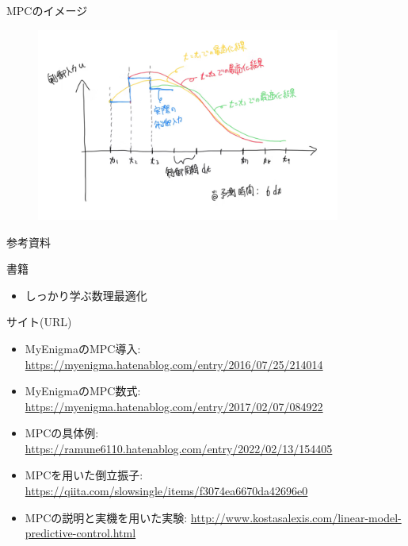 \documentclass[dvipdfmx,12pt]{beamer}
\begin{document}
    \begin{frame}{MPCのイメージ}
        \footnotesize

        \begin{figure}[H]
            \centering
            \includegraphics[clip, width = 10.0cm]{takahoribe.png}
        \end{figure}
        \centering
        \tiny{
        }
    \end{frame}

    \begin{frame}{参考資料}
        \footnotesize

        書籍\\
        \begin{itemize}
            \item しっかり学ぶ数理最適化
        \end{itemize}

        サイト(URL) \\
        \begin{itemize}
            \item MyEnigmaのMPC導入: \href{https://myenigma.hatenablog.com/entry/2016/07/25/214014}{https://myenigma.hatenablog.com/entry/2016/07/25/214014}
            \item MyEnigmaのMPC数式: \href{https://myenigma.hatenablog.com/entry/2017/02/07/084922}{https://myenigma.hatenablog.com/entry/2017/02/07/084922}
            \item MPCの具体例: \href{https://ramune6110.hatenablog.com/entry/2022/02/13/154405}{https://ramune6110.hatenablog.com/entry/2022/02/13/154405}
            \item MPCを用いた倒立振子: \href{https://qiita.com/slowsingle/items/f3074ea6670da42696e0}{https://qiita.com/slowsingle/items/f3074ea6670da42696e0}
            \item MPCの説明と実機を用いた実験: \href{http://www.kostasalexis.com/linear-model-predictive-control.html}{http://www.kostasalexis.com/linear-model-predictive-control.html}
        \end{itemize}
    \end{frame}
    
\end{document}
